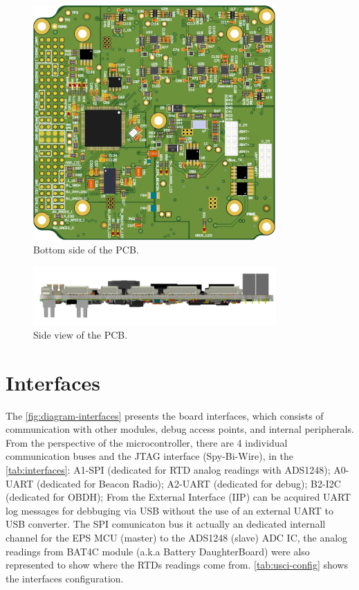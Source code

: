\begin{figure}[!ht]
    \begin{center}
        \includegraphics[width=93mm]{figures/eps2-pcb-bottom.png}
        \caption{Bottom side of the PCB.}
        \label{fig:pcb-bottom}
    \end{center}
\end{figure}

\begin{figure}[!ht]
    \begin{center}
        \includegraphics[width=93mm]{figures/eps2-pcb-side.png}
        \caption{Side view of the PCB.}
        \label{fig:pcb-side}
    \end{center}
\end{figure}

\section{Interfaces}

The \autoref{fig:diagram-interfaces} presents the board interfaces, which consists of communication with other modules, debug access points, and internal peripherals. From the perspective of the microcontroller, there are 4 individual communication buses and the JTAG interface (Spy-Bi-Wire), in the \autoref{tab:interfaces}: A1-SPI (dedicated for RTD analog readings with ADS1248); A0-UART (dedicated for Beacon Radio); A2-UART (dedicated for debug); B2-I2C (dedicated for OBDH); From the External Interface (IIP) can be acquired UART log messages for debbuging via USB without the use of an external UART to USB converter. The SPI comunicaton bus it actually an dedicated internall channel for the EPS MCU (master) to the ADS1248 (slave) ADC IC, the analog readings from BAT4C module (a.k.a Battery DaughterBoard) were also represented to show where the RTDs readings come from. \autoref{tab:usci-config} shows the interfaces configuration.

